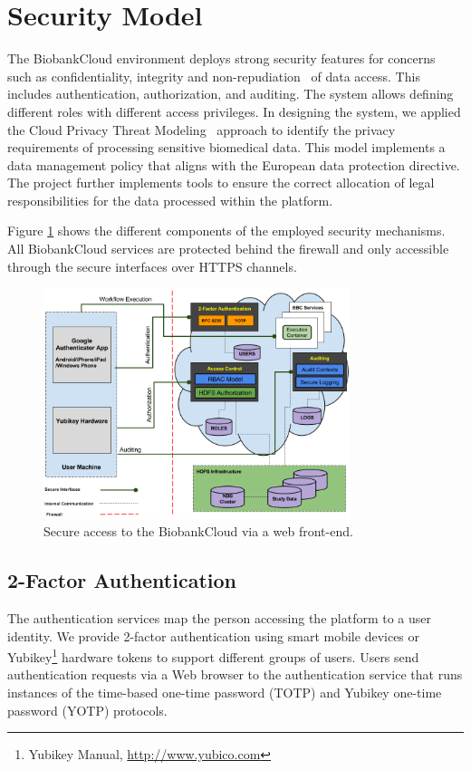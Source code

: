 \section{Security Model}

The BiobankCloud environment deploys strong security features for concerns such as confidentiality, integrity and non-repudiation~\cite{BBCSEC} of data access. This includes authentication, authorization, and auditing. The system allows defining different roles with different access privileges. In designing the system, we applied the Cloud Privacy Threat Modeling~\cite {CPTM} approach to identify the privacy requirements of processing sensitive biomedical data. This model implements a data management policy that aligns with the European data protection directive. The project further implements tools to ensure the correct allocation of legal responsibilities for the data processed within the platform. 

Figure \ref{fig:security} shows the different components of the employed security mechanisms. All BiobankCloud services are protected behind the firewall and only accessible through the secure interfaces over HTTPS channels.

\begin{figure}[h]
\centering
\includegraphics[width=0.8\textwidth]{./imgs/security.png}
\caption{Secure access to the BiobankCloud via a web front-end.}
\label{fig:security}
\end{figure}

\subsection{2-Factor Authentication}
The authentication services map the person accessing the platform to a user identity. We provide 2-factor authentication using smart mobile devices or Yubikey\footnote{Yubikey Manual, \url{http://www.yubico.com}} hardware tokens to support different groups of users. Users send authentication requests via a Web browser to the authentication service that runs instances of the time-based one-time password (TOTP) and Yubikey one-time password (YOTP) protocols.

